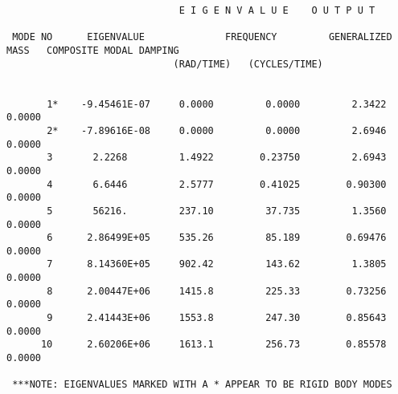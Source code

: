 \documentclass[paper=a4, fontsize=11pt]{scrartcl} %
\numberwithin{equation}{section} %
\numberwithin{figure}{section} %
\numberwithin{table}{section} %
\begin{document}
\newpage
\begin{sidewaysfigure}
\begin{verbatim}
                              E I G E N V A L U E    O U T P U T     

 MODE NO      EIGENVALUE              FREQUENCY         GENERALIZED MASS   COMPOSITE MODAL DAMPING            
                             (RAD/TIME)   (CYCLES/TIME)


       1*    -9.45461E-07     0.0000         0.0000         2.3422         0.0000    
       2*    -7.89616E-08     0.0000         0.0000         2.6946         0.0000    
       3       2.2268         1.4922        0.23750         2.6943         0.0000    
       4       6.6446         2.5777        0.41025        0.90300         0.0000    
       5       56216.         237.10         37.735         1.3560         0.0000    
       6      2.86499E+05     535.26         85.189        0.69476         0.0000    
       7      8.14360E+05     902.42         143.62         1.3805         0.0000    
       8      2.00447E+06     1415.8         225.33        0.73256         0.0000    
       9      2.41443E+06     1553.8         247.30        0.85643         0.0000    
      10      2.60206E+06     1613.1         256.73        0.85578         0.0000    

 ***NOTE: EIGENVALUES MARKED WITH A * APPEAR TO BE RIGID BODY MODES
\end{verbatim}
\end{sidewaysfigure}
\end{document}

